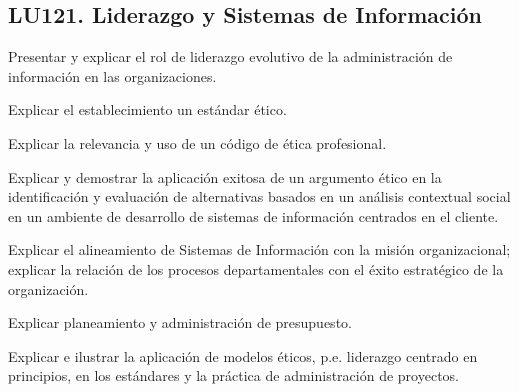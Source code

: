 \subsection{LU121. Liderazgo y Sistemas de Información}\label{sec:BOK-LU121}\label{sec:LU121}
\begin{LearningUnit}
\begin{LUGoal}
\item Presentar y explicar el rol de liderazgo evolutivo de la administración de información en las organizaciones.
\end{LUGoal}

\begin{LUObjective}
\item Explicar el establecimiento un estándar ético.
\item Explicar la relevancia y uso de un código de ética profesional.
\item Explicar y demostrar la aplicación exitosa de un argumento ético en la identificación y evaluación de alternativas basados en un análisis contextual social en un ambiente de desarrollo de sistemas de información centrados en el cliente.
\item Explicar el alineamiento de Sistemas de Información con la misión organizacional; explicar la relación de los procesos departamentales con el éxito estratégico de la organización.
\item Explicar planeamiento y administración de presupuesto.
\item Explicar e ilustrar la aplicación de modelos éticos, p.e. liderazgo centrado en principios, en los estándares y la práctica de administración de proyectos.
\end{LUObjective}
\end{LearningUnit}

